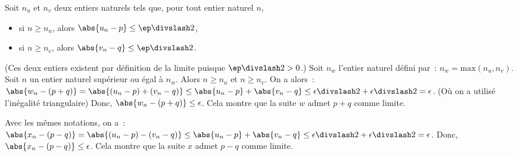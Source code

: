     Soit $n_u$ et $n_v$ deux entiers naturels tels que, pour tout entier naturel $n$, 
    \begin{itemize}[nosep]
        \item si $n \geq n_u$, alors $\abs{u_n - p} \leq \ep \divslash 2$, 
        \item si $n \geq n_v$, alors $\abs{v_n - q} \leq \ep \divslash 2$. 
    \end{itemize}
    (Ces deux entiers existent par définition de la limite puisque $\ep \divslash 2 > 0$.)
    Soit $n_w$ l'entier naturel défini par : $n_w = \mathrm{max}(n_u, n_v)$. 
    Soit $n$ un entier naturel supérieur ou égal à $n_w$. 
    Alors $n \geq n_u$ et $n \geq n_v$. 
    On a alors : $\abs{w_n - (p+q)} = \abs{(u_n-p) + (v_n-q)} \leq \abs{u_n-p} + \abs{v_n-q} \leq \epsilon \divslash 2 + \epsilon \divslash 2 = \epsilon$.
    (Où on a utilisé l'inégalité triangulaire)
    Donc, $\abs{w_n - (p+q)} \leq \epsilon$.
    Cela montre que la suite $w$ admet $p+q$ comme limite.

    Avec les mêmes notations, on a : $\abs{x_n - (p-q)} = \abs{(u_n-p) - (v_n-q)} \leq \abs{u_n-p} + \abs{v_n-q} \leq \epsilon \divslash 2 + \epsilon \divslash 2 = \epsilon$.
    Donc, $\abs{x_n - (p-q)} \leq \epsilon$.
    Cela montre que la suite $x$ admet $p-q$ comme limite.

